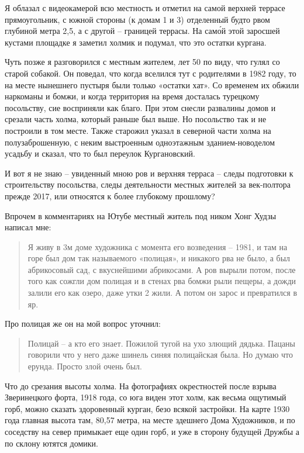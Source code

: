 Я облазал с видеокамерой всю местность и отметил на самой верхней террасе прямоугольник, с южной стороны (к домам 1 и 3) отделенный будто рвом глубиной метра 2,5, а с другой – границей террасы. На сам\'ой этой заросшей кустами площадке я заметил холмик и подумал, что это остатки кургана.

Чуть позже я разговорился с местным жителем, лет 50 по виду, что гулял со старой собакой. Он поведал, что когда вселился тут с родителями в 1982 году, то на месте нынешнего пустыря были только «остатки хат». Со временем их обжили наркоманы и бомжи, и когда территория на время досталась турецкому посольству, сие восприняли как благо. При этом снесли развалины домов и срезали часть холма, который раньше был выше. Но посольство так и не построили в том месте. Также старожил указал в северной части холма на полузаброшенную, с неким выстроенным одноэтажным зданием-новоделом усадьбу и сказал, что то был переулок Кургановский. 

И вот я не знаю – увиденный мною ров и верхняя терраса – следы подготовки к строительству посольства, следы деятельности местных жителей за век-полтора прежде 2017, или относятся к более глубокому прошлому?

Впрочем в комментариях на Ютубе местный житель под ником Хонг Худзы написал мне:

\begin{quotation}
Я живу в 3м доме художника с момента его возведения – 1981, и там на горе был дом так называемого «полицая», и никакого рва не было, а был абрикосовый сад, с вкуснейшими абрикосами. А ров вырыли потом, после того как сожгли дом полицая и в стенах рва бомжи рыли пещеры, а дожди залили его как озеро, даже утки 2 жили. А потом он зарос и превратился в яр.
\end{quotation}

Про полицая же он на мой вопрос уточнил:

\begin{quotation}
Полицай – а кто его знает. Пожилой тугой на ухо злющий дядька. Пацаны говорили что у него даже шинель синяя полицайская была. Но думаю что ерунда. Просто злой очень был.
\end{quotation}

Что до срезания высоты холма. На фотографиях окр\-естностей после взрыва Зверинецкого форта, 1918 года, со юга виден этот холм, как весьма ощутимый горб, можно сказать здоровенный курган, безо всякой застройки. На карте 1930 года главная высота там, 80,57 метра, на месте здешнего Дома Художников, и по соседству на север примыкает еще один горб, и уже в сторону будущей Дружбы а по склону ютятся домики. 

